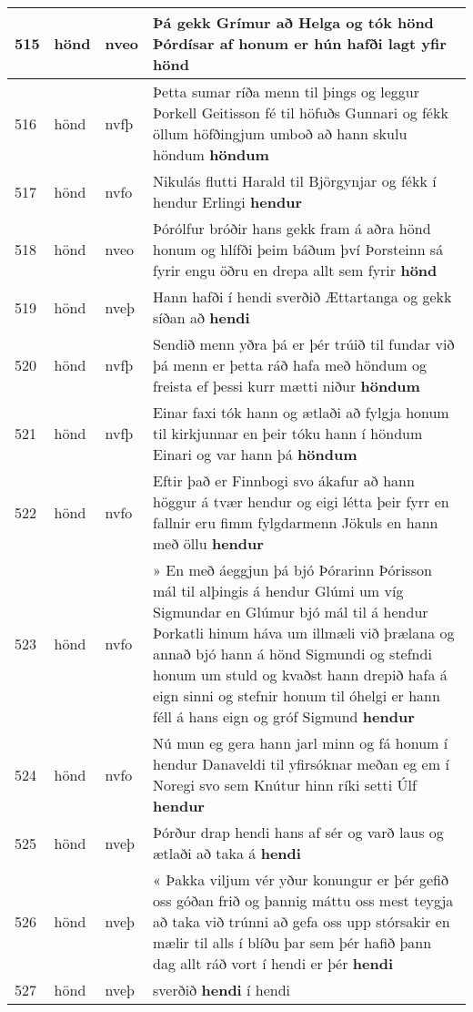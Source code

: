 \documentclass{article}
\begin{document}
\begin{longtable}{p{1cm}|p{1cm}|p{1cm}|p{13cm}}
\hline
515&hönd&nveo&Þá gekk Grímur að Helga og tók hönd Þórdísar af honum er hún hafði lagt yfir \textbf{hönd} \\
\hline
516&hönd&nvfþ&Þetta sumar ríða menn til þings og leggur Þorkell Geitisson fé til höfuðs Gunnari og fékk öllum höfðingjum umboð að hann skulu höndum \textbf{höndum} \\
\hline
517&hönd&nvfo&Nikulás flutti Harald til Björgynjar og fékk í hendur Erlingi \textbf{hendur} \\
\hline
518&hönd&nveo&Þórólfur bróðir hans gekk fram á aðra hönd honum og hlífði þeim báðum því Þorsteinn sá fyrir engu öðru en drepa allt sem fyrir \textbf{hönd} \\
\hline
519&hönd&nveþ&Hann hafði í hendi sverðið Ættartanga og gekk síðan að \textbf{hendi} \\
\hline
520&hönd&nvfþ&Sendið menn yðra þá er þér trúið til fundar við þá menn er þetta ráð hafa með höndum og freista ef þessi kurr mætti niður \textbf{höndum} \\
\hline
521&hönd&nvfþ&Einar faxi tók hann og ætlaði að fylgja honum til kirkjunnar en þeir tóku hann í höndum Einari og var hann þá \textbf{höndum} \\
\hline
522&hönd&nvfo&Eftir það er Finnbogi svo ákafur að hann höggur á tvær hendur og eigi létta þeir fyrr en fallnir eru fimm fylgdarmenn Jökuls en hann með öllu \textbf{hendur} \\
\hline
523&hönd&nvfo&» En með áeggjun þá bjó Þórarinn Þórisson mál til alþingis á hendur Glúmi um víg Sigmundar en Glúmur bjó mál til á hendur Þorkatli hinum háva um illmæli við þrælana og annað bjó hann á hönd Sigmundi og stefndi honum um stuld og kvaðst hann drepið hafa á eign sinni og stefnir honum til óhelgi er hann féll á hans eign og gróf Sigmund \textbf{hendur} \\
\hline
524&hönd&nvfo&Nú mun eg gera hann jarl minn og fá honum í hendur Danaveldi til yfirsóknar meðan eg em í Noregi svo sem Knútur hinn ríki setti Úlf \textbf{hendur} \\
\hline
525&hönd&nveþ&Þórður drap hendi hans af sér og varð laus og ætlaði að taka á \textbf{hendi} \\
\hline
526&hönd&nveþ&« Þakka viljum vér yður konungur er þér gefið oss góðan frið og þannig máttu oss mest teygja að taka við trúnni að gefa oss upp stórsakir en mælir til alls í blíðu þar sem þér hafið þann dag allt ráð vort í hendi er þér \textbf{hendi} \\
\hline
527&hönd&nveþ&sverðið \textbf{hendi} í hendi\\

\end{longtable}
\end{document}
